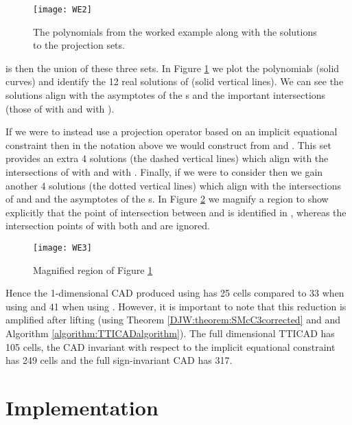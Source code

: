 \documentclass{article}
\begin{document}
\begin{figure}
\caption{The polynomials from the worked example along with the solutions to the projection sets.}
\label{fig:workedexample4}
\begin{center}
\texttt{[image: WE2]}
\end{center}
\vskip-10pt
\end{figure}

 is then the union of these three sets.  In Figure \ref{fig:workedexample4} we plot the polynomials (solid curves) and identify the 12 real solutions of  (solid vertical lines).  We can see the solutions align with the asymptotes of the s and the important intersections (those of  with  and  with ).   

If we were to instead use a projection operator based on an implicit equational constraint  then in the notation above we would construct  from  and .  This set provides an extra 4 solutions (the dashed vertical lines) which align with the intersections of  with  and  with .  
Finally, if we were to consider  then we gain another 4 solutions (the dotted vertical lines) which align with the intersections of  and  and the asymptotes of the s.  
In Figure \ref{fig:workedexample5} we magnify a region
to show explicitly that the point of intersection between  and  is identified in , whereas the intersection points of  with both  and  are ignored.

\begin{figure}
\caption{Magnified region of Figure \ref{fig:workedexample4}}\label{fig:workedexample5}
\begin{center}
\texttt{[image: WE3]}
\end{center}
\vskip-20pt
\end{figure}

Hence the 1-dimensional CAD produced using  has 25 cells compared to 33 when using  and 41 when using .  However, it is important to note that this reduction is amplified after lifting (using Theorem \ref{DJW:theorem:SMcC3corrected} and and Algorithm \ref{algorithm:TTICADalgorithm}).  The full dimensional TTICAD has 105 cells, the CAD invariant with respect to the implicit equational constraint has 249 cells  and the full sign-invariant CAD has 317.


\section{Implementation}
\label{sec:Implementation}
\end{document}
